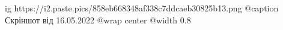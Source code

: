  
 
 
 
 

\ifcmt
  ig https://i2.paste.pics/858eb668348af338c7ddcaeb30825b13.png
	@caption Скріншот від 16.05.2022
  @wrap center
  @width 0.8
\fi
